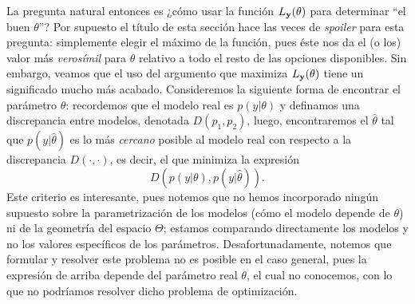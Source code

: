 La pregunta  natural entonces es ¿cómo usar la función $L_{\mathbf{y}}(\theta)$ para determinar ``el buen $\theta$''? Por supuesto el título de esta sección hace las veces de \emph{spoiler} para esta pregunta: simplemente elegir el máximo de la función, pues éste nos da el (o los) valor más \emph{verosímil} para $\theta$ relativo a todo el resto de las opciones disponibles. Sin embargo, veamos que el uso del argumento que maximiza $L_{\mathbf{y}}(\theta)$ tiene un significado  mucho más  acabado. Consideremos la siguiente forma de encontrar el parámetro $\theta$: recordemos que el  modelo real es $p(y|\theta)$ y definamos una discrepancia entre modelos, denotada $D(p_1,p_2)$, luego, encontraremos el $\hat\theta$ tal que $p(y|\hat\theta)$ es lo más \emph{cercano} posible al modelo real con respecto a la discrepancia $D(\cdot,\cdot)$, es decir, el que minimiza la expresión
\begin{equation}
    	D(p(y|\theta),p(y|\hat\theta)).
\end{equation}  
Este criterio es interesante, pues notemos que no hemos incorporado ningún supuesto sobre la parametrización de  los  modelos (cómo el  modelo depende de $\theta$) ni de la  geometría del espacio  $\Theta$; estamos comparando directamente los modelos y no los  valores específicos de los parámetros. Desafortunadamente, notemos que formular y resolver  este problema no es posible en el caso general, pues la expresión de arriba depende del parámetro real $\theta$, el cual no conocemos, con lo que no podríamos resolver dicho problema de optimización. 


